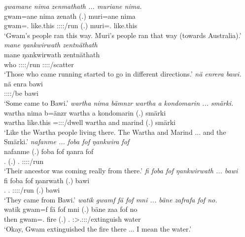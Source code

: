 \begin{exe}
	\emph{gwamane nima zenmathath ... muriane nima.}\\
	\gll gwam=ane nima zenath (.) muri=ane nima\\ 
	gwam=\Poss.{\Sg} like.this \Stpl:\Sbj:\Pst:\Pfv:\Venit/run (.) muri=\Poss.{\Sg} like.this\\
	\trans `Gwam's people ran this way. Muri's people ran that way (towards Australia).'
	\emph{mane ŋankwirwath zentnäthath}\\
	\gll mane ŋankwirwath zentnäthath\\ 
	who \Stpl:\Sbj:\Pst:\Ipfv:\Venit/run \Stpl:\Sbj:\Pst:\Pfv:\Venit/scatter\\
	\trans `Those who came running started to go in different directions.'
	\emph{nä enrera bawi.}\\
	\gll nä enra bawi\\ 
	{\Indf} \Sg:\Sbj:\Pst:\Ipfv:\Venit/be bawi\\
	\trans `Some came to Bawi.'
	\emph{wartha nima bämnzr wartha a kondomarin ... smärki.}\\
	\gll wartha nima b=änzr wartha a kondomarin (.) smärki\\ 
	wartha like.this \Med=\Stpl:\Sbj:\Nonpast:\Ipfv/dwell wartha and marind (.) smärki\\
	\trans `Like the Wartha people living there. The Wartha and Marind ... and the Smärki.'
	\newpage
{} 
	\emph{nafanme ... foba fof ŋankwira fof}\\
	\gll nafanme (.) foba fof ŋanra fof\\ 
	\Tnsg.{\Poss} (.) \Dist.{\Abl} {\Emph} \Sg:\Sbj:\Pst:\Ipfv:\Venit/run {\Emph}\\
	\trans `Their ancestor was coming really from there.'
	\emph{fi foba fof ŋankwirwath ... bawi}\\
	\gll fi foba fof ŋanrwath (.) bawi\\ 
	\Third.{\Abs} \Dist.{\Abl} {\Emph} \Stpl:\Sbj:\Pst:\Ipfv:\Venit/run (.) bawi\\
	\trans `They came from Bawi.'
	\emph{watik gwamf fä fof mni ... bäne zafrafa fof no.}\\
	\gll watik gwam=f fä fof mni (.) bäne zaa fof no\\ 
	then gwam=\Erg.{\Sg} {\Dist} {\Emph} fire (.) \Recog.{\Abs} \Sg:\Sbj>\Tsg.\F:\Obj:\Pst:\Pfv/extinguish {\Emph} water\\
	\trans `Okay, Gwam extinguished the fire there ... I mean the water.'

\end{exe}
